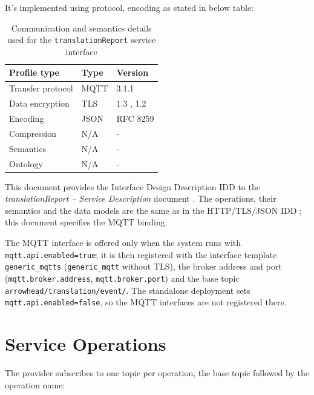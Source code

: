 \documentclass[a4paper]{arrowhead}
\begin{document}
It's implemented using protocol, encoding as stated in below table:
\begin{table}[ht!]
  \centering
  \begin{tabular}{|l|l|l|}
    \hline
    \rowcolor{gray!33} Profile type & Type & Version \\ \hline
    Transfer protocol & MQTT & 3.1.1 \cite{mqtt311} \\ \hline
    Data encryption & TLS & 1.3 \cite{rfc8446}, 1.2 \cite{rfc5246} \\ \hline
    Encoding & JSON & RFC 8259 \cite{rfc8259} \\ \hline
    Compression & N/A & - \\ \hline
    Semantics & N/A & - \\ \hline
    Ontology & N/A & - \\ \hline
  \end{tabular}
  \caption{Communication and semantics details used for the \texttt{translationReport} service interface}
  \label{tab:comunication_semantics_profile}
\end{table}

This document provides the Interface Design Description IDD to the \textit{translationReport -- Service Description} document \cite{tm-translationReport-sd}.
The operations, their semantics and the data models are the same as in the HTTP/TLS/JSON IDD \cite{tm-translationReport-http-idd}; this document specifies the MQTT binding.

The MQTT interface is offered only when the system runs with \texttt{mqtt.api.enabled=true}; it is then registered with the interface template \texttt{generic\_\allowbreak{}mqtts} (\texttt{generic\_\allowbreak{}mqtt} without TLS), the broker address and port (\texttt{mqtt.\allowbreak{}broker.\allowbreak{}address}, \texttt{mqtt.\allowbreak{}broker.\allowbreak{}port}) and the base topic \texttt{arrowhead/\allowbreak{}translation/\allowbreak{}event/\allowbreak{}}. The standalone deployment sets \texttt{mqtt.\allowbreak{}api.\allowbreak{}enabled=\allowbreak{}false}, so the MQTT interfaces are not registered there.

\newpage

\section{Service Operations}
\label{sec:operations}

The provider subscribes to one topic per operation, the base topic followed by the operation name:
\end{document}
